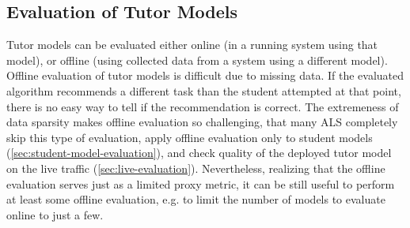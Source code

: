 

\subsection{Evaluation of Tutor Models}
\label{tutors.evaluation}


Tutor models can be evaluated either online (in a running system using that model),
or offline (using collected data from a system using a different model).
Offline evaluation of tutor models is difficult due to missing data.
If the evaluated algorithm recommends a different task than the student attempted
at that point, there is no easy way to tell if the recommendation is correct. %
The extremeness of data sparsity makes offline evaluation so challenging,
that many ALS completely skip this type of evaluation, %
apply offline evaluation only to student models (\cref{sec:student-model-evaluation}),
and check quality of the deployed tutor model on the live traffic
(\cref{sec:live-evaluation}).
Nevertheless, realizing that the offline evaluation serves just as
a limited proxy metric,
it can be still useful to perform at least some offline evaluation,
e.g. to limit the number of models to evaluate online to just a few.

